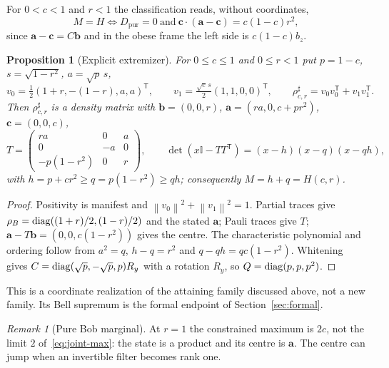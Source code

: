 \documentclass[11pt]{article}
\newtheorem{proposition}[theorem]{Proposition}
\theoremstyle{remark}\newtheorem{remark}[theorem]{Remark}
\newcommand{\id}{\mathbb I}\newcommand{\ket}[1]{|#1\rangle}
\newcommand{\norm}[1]{\left\lVert#1\right\rVert}
\newcommand{\cv}{\bm c}\newcommand{\av}{\bm a}\newcommand{\bv}{\bm b}
\newcommand{\Dp}{D_{\mathrm{pur}}}
\begin{document}
For $0<c<1$ and $r<1$ the classification reads, without coordinates,
\[
 M=H\iff \Dp=0\ \text{and}\ \cv\cdot(\av-\cv)=c(1-c)r^2,
\]
since $\av-\cv=C\bv$ and in the obese frame the left side is $c(1-c)b_z$.

\begin{proposition}[Explicit extremizer]\label{prop:dyadic}
For $0\le c\le1$ and $0\le r<1$ put $p=1-c$, $s=\sqrt{1-r^2}$, $a=\sqrt p\,s$,
\[
 v_0=\tfrac12(1+r,-(1-r),a,a)^{\mathsf T},\qquad
 v_1=\tfrac{\sqrt c\,s}{2}(1,1,0,0)^{\mathsf T},\qquad
 \rho^\sharp_{c,r}=v_0v_0^{\mathsf T}+v_1v_1^{\mathsf T}.
\]
Then $\rho^\sharp_{c,r}$ is a density matrix with $\bv=(0,0,r)$,
$\av=(ra,0,c+pr^2)$, $\cv=(0,0,c)$,
\[
 T=\begin{pmatrix}ra&0&a\\0&-a&0\\-p(1-r^2)&0&r\end{pmatrix},\qquad
 \det(x\id-TT^{\mathsf T})=(x-h)(x-q)(x-qh),
\]
with $h=p+cr^2\ge q=p(1-r^2)\ge qh$; consequently $M=h+q=H(c,r)$.
\end{proposition}
\begin{proof}
Positivity is manifest and $\norm{v_0}^2+\norm{v_1}^2=1$. Partial traces give
$\rho_B=\operatorname{diag}((1+r)/2,(1-r)/2)$ and the stated $\av$; Pauli traces give $T$;
$\av-T\bv=(0,0,c(1-r^2))$ gives the centre. The characteristic polynomial and
ordering follow from $a^2=q$, $h-q=r^2$ and $q-qh=qc(1-r^2)$. Whitening gives
$C=\operatorname{diag}(\sqrt p,-\sqrt p,p)R_y$ with a rotation $R_y$, so $Q=\operatorname{diag}(p,p,p^2)$.
\end{proof}
This is a coordinate realization of the attaining family discussed above,
not a new family. Its Bell supremum is the formal endpoint of
Section~\ref{sec:formal}.

\begin{remark}[Pure Bob marginal]
At $r=1$ the constrained maximum is $2c$, not the limit $2$
of~\eqref{eq:joint-max}: the state is a product and its centre is $\av$. The
centre can jump when an invertible filter becomes rank one.
\end{remark}
\end{document}
